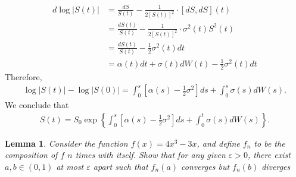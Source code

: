 \documentclass[12pt,reqno]{amsart}
\numberwithin{equation}{section}  %
\newcommand{\ee}{\varepsilon}
\newtheorem{lemma}[theorem]{Lemma}
\begin{document}
\begin{equation*}
\begin{split}
d \log | S(t) |
& = \frac{dS}{S(t)} -\frac{1}{2[S(t)]^{2}} \cdot [dS, dS](t)
\\
& = \frac{dS(t)}{S(t)}  -\frac{1}{2[S(t)]^{2}} \cdot \sigma^{2}(t) S^{2}(t)
\\
& = \frac{dS(t)}{S(t)} - \frac{1}{2} \sigma^{2}(t) dt
\\
& = \alpha(t) dt + \sigma(t) d W(t) - \frac{1}{2} \sigma^{2}(t) dt
\end{split}
\end{equation*}
Therefore, 
\begin{equation*}
\begin{split}
  \log | S(t) | - \log | S(0) | = \int_{0}^{s} [\alpha(s) - \frac{1}{2}\sigma^{2}] ds + \int_{0}^{s} \sigma(s) dW(s). 
\end{split}
\end{equation*}
We conclude that
\begin{equation*}
\begin{split}
S(t) = S_{0} \exp \left \{\int_{0}^{s} [\alpha(s) - \frac{1}{2}\sigma^{2}] ds + \int_{0}^{t} \sigma(s) dW(s) \right \}.
\end{split}
\end{equation*}
\begin{lemma}
Consider the function $f(x) = 4x^3 - 3x$, and define $f_n$ to be
the composition of $f$ $n$ times with itself. Show that
for any given $\ee > 0$, there exist $a,b \in (0,1)$ at most $\ee$ apart
such that $f_n(a)$ converges but $f_n(b)$ diverges
\end{lemma}
\end{document}
